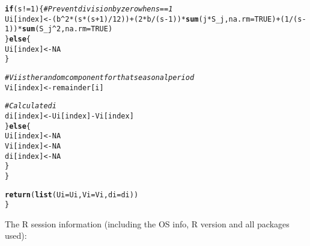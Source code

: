 \documentclass{article}\usepackage[]{graphicx}\usepackage[]{xcolor}
\makeatletter
\newcommand{\hlnum}[1]{\textcolor[rgb]{0.686,0.059,0.569}{#1}}%
\newcommand{\hlcom}[1]{\textcolor[rgb]{0.678,0.584,0.686}{\textit{#1}}}%
\newcommand{\hlopt}[1]{\textcolor[rgb]{0,0,0}{#1}}%
\newcommand{\hlstd}[1]{\textcolor[rgb]{0.345,0.345,0.345}{#1}}%
\newcommand{\hlkwa}[1]{\textcolor[rgb]{0.161,0.373,0.58}{\textbf{#1}}}%
\newcommand{\hlkwb}[1]{\textcolor[rgb]{0.69,0.353,0.396}{#1}}%
\newcommand{\hlkwc}[1]{\textcolor[rgb]{0.333,0.667,0.333}{#1}}%
\newcommand{\hlkwd}[1]{\textcolor[rgb]{0.737,0.353,0.396}{\textbf{#1}}}%
\newenvironment{kframe}{%
 \def\at@end@of@kframe{}%
 \ifinner\ifhmode%
  \def\at@end@of@kframe{\end{minipage}}%
  \begin{minipage}{\columnwidth}%
 \fi\fi%
 \def\FrameCommand##1{\hskip\@totalleftmargin \hskip-\fboxsep
 \colorbox{shadecolor}{##1}\hskip-\fboxsep
     \hskip-\linewidth \hskip-\@totalleftmargin \hskip\columnwidth}%
 \MakeFramed {\advance\hsize-\width
   \@totalleftmargin\z@ \linewidth\hsize
   \@setminipage}}%
 {\par\unskip\endMakeFramed%
 \at@end@of@kframe}
\newenvironment{knitrout}{}{} %
\makeatother
\begin{document}
\begin{knitrout}
\begin{kframe}
\begin{alltt}
      \hlkwa{if} \hlstd{(s} \hlopt{!=} \hlnum{1}\hlstd{) \{}  \hlcom{# Prevent division by zero when s == 1}
        \hlstd{Ui[index]} \hlkwb{<-} \hlstd{(b}\hlopt{^}\hlnum{2} \hlopt{*} \hlstd{(s} \hlopt{*} \hlstd{(s} \hlopt{+} \hlnum{1}\hlstd{)} \hlopt{/} \hlnum{12}\hlstd{))} \hlopt{+} \hlstd{(}\hlnum{2} \hlopt{*} \hlstd{b} \hlopt{/} \hlstd{(s} \hlopt{-} \hlnum{1}\hlstd{))} \hlopt{*} \hlkwd{sum}\hlstd{(j} \hlopt{*} \hlstd{S_j,} \hlkwc{na.rm} \hlstd{=} \hlnum{TRUE}\hlstd{)} \hlopt{+} \hlstd{(}\hlnum{1} \hlopt{/} \hlstd{(s} \hlopt{-} \hlnum{1}\hlstd{))} \hlopt{*} \hlkwd{sum}\hlstd{(S_j}\hlopt{^}\hlnum{2}\hlstd{,} \hlkwc{na.rm} \hlstd{=} \hlnum{TRUE}\hlstd{)}
      \hlstd{\}} \hlkwa{else} \hlstd{\{}
        \hlstd{Ui[index]} \hlkwb{<-} \hlnum{NA}
      \hlstd{\}}

      \hlcom{# Vi is the random component for that seasonal period}
      \hlstd{Vi[index]} \hlkwb{<-} \hlstd{remainder[i]}

      \hlcom{# Calculate di}
      \hlstd{di[index]} \hlkwb{<-} \hlstd{Ui[index]} \hlopt{-} \hlstd{Vi[index]}
    \hlstd{\}} \hlkwa{else} \hlstd{\{}
      \hlstd{Ui[index]} \hlkwb{<-} \hlnum{NA}
      \hlstd{Vi[index]} \hlkwb{<-} \hlnum{NA}
      \hlstd{di[index]} \hlkwb{<-} \hlnum{NA}
    \hlstd{\}}
  \hlstd{\}}

  \hlkwd{return}\hlstd{(}\hlkwd{list}\hlstd{(}\hlkwc{Ui} \hlstd{= Ui,} \hlkwc{Vi} \hlstd{= Vi,} \hlkwc{di} \hlstd{= di))}
\hlstd{\}}
\end{alltt}
\end{kframe}
\end{knitrout}

The R session information (including the OS info, R version and all
packages used):
\end{document}
